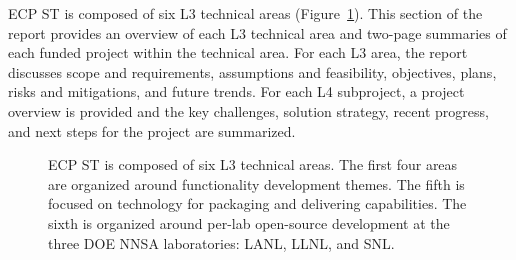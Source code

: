\documentclass{ecpreport-publicv1}
\newcommand{\pmr}{Programming Models \& Runtimes}
\begin{document}
ECP ST is composed of six L3 technical areas (Figure~\ref{fig:l3-overview}).  This section of the report provides an overview of each L3 technical area and two-page summaries of each funded project within the technical area.  For each L3 area, the report discusses scope and requirements, assumptions and feasibility, objectives, plans, risks and mitigations, and future trends.  For each L4 subproject, a project overview is provided and the key challenges, solution strategy, recent progress, and next steps for the project are summarized.
\
\begin{figure}[H]
	\centering
	\caption{ECP ST is composed of six L3 technical areas.  The first four areas are organized around functionality development themes.  The fifth is focused on technology for packaging and delivering capabilities.  The sixth is organized around per-lab open-source development at the three DOE NNSA laboratories: LANL, LLNL, and SNL.  }
	\label{fig:l3-overview}
\end{figure}

\newpage

\newpage

\newpage

\newpage

\newpage

\newpage


\newpage

\newpage

\newpage

\newpage

\newpage
\end{document}
